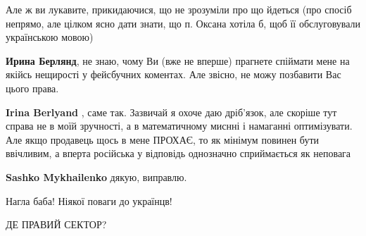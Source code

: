 \begin{itemize}
\begin{itemize}
Але ж ви лукавите, прикидаючися, що не зрозуміли про що йдеться (про спосіб
непрямо, але цілком ясно дати знати, що п. Оксана хотіла б, щоб її
обслуговували українською мовою)


 
\textbf{Ирина Берлянд}, не знаю, чому Ви (вже не вперше) прагнете спіймати мене
на якійсь нещирості у фейсбучних коментах. Але звісно, не можу позбавити Вас
цього права.

 
\textbf{Irina Berlyand} , саме так. Зазвичай я охоче даю дріб'язок, але скоріше
тут справа не в моїй зручності, а в математичному миснні і намаганні
оптимізувати. Але якщо продавець щось в мене ПРОХАЄ, то як мінімум повинен бути
ввічливим, а вперта російська у відповідь однозначно сприймається як неповага

 
\textbf{Sashko Mykhailenko} дякую, виправлю.

\end{itemize}

 
Нагла баба! Ніякої поваги до українцв!

 
ДЕ ПРАВИЙ СЕКТОР?


\end{itemize}
